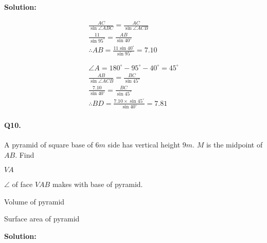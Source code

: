 \documentclass{article}
\begin{document}
{\scriptsize \textbf{Solution:}}

\[
  \begin{aligned}
    \frac{AC}{\sin \angle ABC} = \frac{AC}{\sin \angle ACB} \\
    \frac{11}{\sin 95^{\circ}} = \frac{AB}{\sin 40^{\circ}} \\
    \therefore AB = \frac{11 \sin 40^{\circ}}{\sin 95^{\circ}} = 7.10 \\
    \\
    \\
    \angle A = 180^{\circ}-95^{\circ}-40^{\circ} = 45^{\circ} \\
    \frac{AB}{\sin \angle ACB} = \frac{BC}{\sin 45^{\circ}} \\
    \frac{7.10}{\sin 40^{\circ}} = \frac{BC}{\sin 45^{\circ}} \\
    \therefore BD = \frac{7.10 \times \sin 45^{\circ}}{\sin 40^{\circ}} = 7.81
  \end{aligned}
\]

\paragraph{Q10.}
A pyramid of square base of $6m$ side has vertical height $9m$. $M$ is the midpoint of $AB$. Find
\begin{enumerate*}[label=\roman*)]
  \item $VA$
  \item $\angle$ of face $VAB$ makes with base of pyramid.
  \item Volume of pyramid
  \item Surface area of pyramid
\end{enumerate*}

{\scriptsize \textbf{Solution:}}
\end{document}
